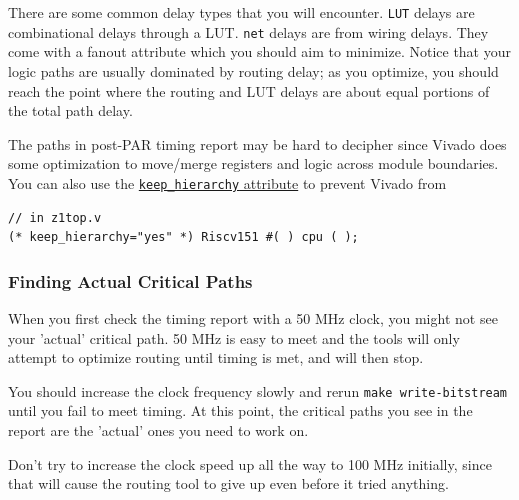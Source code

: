 \documentclass[11pt]{article}
\begin{document}
There are some common delay types that you will encounter.
\verb|LUT| delays are combinational delays through a LUT.
\verb|net| delays are from wiring delays. They come with a fanout attribute which you should aim to minimize.
Notice that your logic paths are usually dominated by routing delay; as you optimize, you should reach the point where the routing and LUT delays are about equal portions of the total path delay.



The paths in post-PAR timing report may be hard to decipher since Vivado does some optimization to move/merge registers and logic across module boundaries.
You can also use the \href{https://www.xilinx.com/support/answers/54778.html}{\texttt{keep\_hierarchy} attribute} to prevent Vivado from 

\begin{verbatim}
// in z1top.v
(* keep_hierarchy="yes" *) Riscv151 #( ) cpu ( );
\end{verbatim}

\subsubsection{Finding Actual Critical Paths}
When you first check the timing report with a 50 MHz clock, you might not see your 'actual' critical path.
50 MHz is easy to meet and the tools will only attempt to optimize routing until timing is met, and will then stop.

You should increase the clock frequency slowly and rerun \verb|make write-bitstream| until you fail to meet timing.
At this point, the critical paths you see in the report are the 'actual' ones you need to work on.

Don't try to increase the clock speed up all the way to 100 MHz initially, since that will cause the routing tool to give up even before it tried anything.
\end{document}

